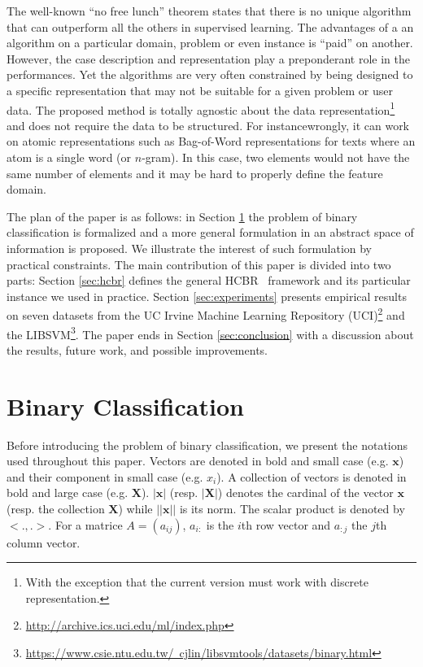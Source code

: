 \documentclass[preprint,12pt]{elsarticle}
\def\HCBR{{\sc HCBR}}
\theoremstyle{definition}
\begin{document}
The well-known ``no free lunch'' theorem states that there is no unique algorithm that can outperform all the others in supervised learning. The advantages of a an algorithm on a particular domain, problem or even instance is ``paid'' on another. However, the case description and representation play a preponderant role in the performances. Yet the algorithms are very often constrained by being designed to a specific representation that may not be suitable for a given problem or user data. The proposed method is totally agnostic about the data representation\footnote{With the exception that the current version must work with discrete representation.} and does not require the data to be structured. For instancewrongly, it can work on atomic representations such as Bag-of-Word representations for texts where an atom is a single word (or $n$-gram). In this case, two elements would not have the same number of elements and it may be hard to properly define the feature domain.

The plan of the paper is as follows: in Section \ref{sec:problem} the problem of binary classification is formalized and a more general formulation in an abstract space of information is proposed. We illustrate the interest of such formulation by practical constraints. The main contribution of this paper is divided into two parts: Section \ref{sec:hcbr} defines the general \HCBR~ framework and its particular instance we used in practice. Section \ref{sec:experiments} presents empirical results on seven datasets from the UC Irvine Machine Learning Repository (UCI)\footnote{\href{http://archive.ics.uci.edu/ml/index.php}{http://archive.ics.uci.edu/ml/index.php}} and the LIBSVM\footnote{\href{https://www.csie.ntu.edu.tw/~cjlin/libsvmtools/datasets/binary.html}{https://www.csie.ntu.edu.tw/~cjlin/libsvmtools/datasets/binary.html}}. The paper ends in Section \ref{sec:conclusion} with a discussion about the results, future work, and possible improvements.


\section{Binary Classification}
\label{sec:problem}

Before introducing the problem of binary classification, we present the notations used throughout this paper. Vectors are denoted in bold and small case (e.g. $\mathbf x$) and their component in small case (e.g. $x_i$). A collection of vectors is denoted in bold and large case (e.g. $\mathbf X$). $|\mathbf x|$ (resp. $|\mathbf X|$) denotes the cardinal of the vector $\mathbf x$ (resp. the collection $\mathbf X$) while $||\mathbf x||$ is its norm. The scalar product is denoted by $<.,.>$. For a matrice $A = (a_{ij})$, $a_{i:}$ is the $i$th row vector and $a_{:j}$ the $j$th column vector. 
\end{document}
